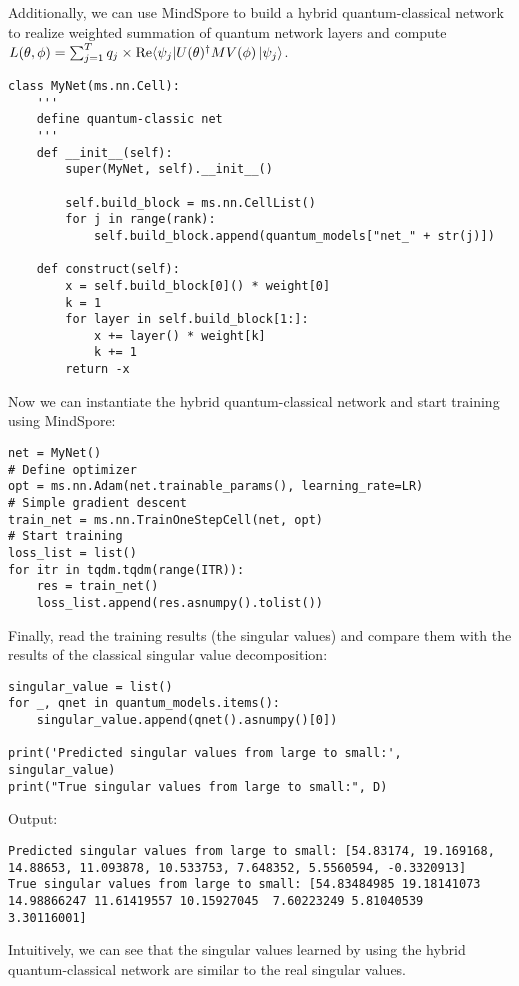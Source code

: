 Additionally, we can use MindSpore to build a hybrid quantum-classical network to realize weighted summation of quantum network layers and compute $L(\theta,\phi) = \sum_{j=1}^T q_j \times \text{Re} \langle\psi_j| U(\theta)^{\dagger} M V(\phi)\ket{\psi_j}$.
\begin{lstlisting}
class MyNet(ms.nn.Cell):
    '''
    define quantum-classic net
    '''
    def __init__(self):
        super(MyNet, self).__init__()

        self.build_block = ms.nn.CellList()
        for j in range(rank):
            self.build_block.append(quantum_models["net_" + str(j)])

    def construct(self):
        x = self.build_block[0]() * weight[0]
        k = 1
        for layer in self.build_block[1:]:
            x += layer() * weight[k]
            k += 1
        return -x
\end{lstlisting}
Now we can instantiate the hybrid quantum-classical network and start training using MindSpore:
\begin{lstlisting}
net = MyNet()
# Define optimizer
opt = ms.nn.Adam(net.trainable_params(), learning_rate=LR)
# Simple gradient descent
train_net = ms.nn.TrainOneStepCell(net, opt)
# Start training
loss_list = list()
for itr in tqdm.tqdm(range(ITR)):
    res = train_net()
    loss_list.append(res.asnumpy().tolist())
\end{lstlisting}

Finally, read the training results (the singular values) and compare them with the results of the classical singular value decomposition:
\begin{lstlisting}
singular_value = list()
for _, qnet in quantum_models.items():
    singular_value.append(qnet().asnumpy()[0])

print('Predicted singular values from large to small:', singular_value)
print("True singular values from large to small:", D)
\end{lstlisting}
Output:
\begin{lstlisting}
Predicted singular values from large to small: [54.83174, 19.169168, 14.88653, 11.093878, 10.533753, 7.648352, 5.5560594, -0.3320913]
True singular values from large to small: [54.83484985 19.18141073 14.98866247 11.61419557 10.15927045  7.60223249 5.81040539  3.30116001]
\end{lstlisting}

Intuitively, we can see that the singular values learned by using the hybrid quantum-classical network are similar to the real singular values.
